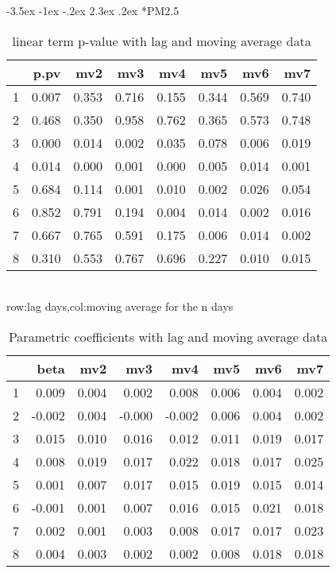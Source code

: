 \documentclass[a4paper, 12pt]{article}
\makeatletter
\def\large{\fontsize{14}{20}\selectfont}
\renewcommand\subsection{\@startsection {subsection}{1}{\z@}%
                                   {-3.5ex \@plus -1ex \@minus -.2ex}%
                                   {2.3ex \@plus.2ex}%
                                   {\centering\normalfont\large\bfseries}}
\makeatother
\begin{document}
\clearpage
\subsection*{PM2.5}
\begin{table}[h]
\centering
\caption{linear term p-value with lag and moving average data}
\begin{tabular}{rrrrrrrr}
  \hline
 & p.pv & mv2 & mv3 & mv4 & mv5 & mv6 & mv7 \\
  \hline
1 & 0.007 & 0.353 & 0.716 & 0.155 & 0.344 & 0.569 & 0.740 \\
  2 & 0.468 & 0.350 & 0.958 & 0.762 & 0.365 & 0.573 & 0.748 \\
  3 & 0.000 & 0.014 & 0.002 & 0.035 & 0.078 & 0.006 & 0.019 \\
  4 & 0.014 & 0.000 & 0.001 & 0.000 & 0.005 & 0.014 & 0.001 \\
  5 & 0.684 & 0.114 & 0.001 & 0.010 & 0.002 & 0.026 & 0.054 \\
  6 & 0.852 & 0.791 & 0.194 & 0.004 & 0.014 & 0.002 & 0.016 \\
  7 & 0.667 & 0.765 & 0.591 & 0.175 & 0.006 & 0.014 & 0.002 \\
  8 & 0.310 & 0.553 & 0.767 & 0.696 & 0.227 & 0.010 & 0.015 \\
   \hline
\end{tabular}
\\row:lag days,col:moving average for the n days
\end{table}

\begin{table}[h]
\centering
\caption{Parametric coefficients with lag and moving average data}
\begin{tabular}{rrrrrrrr}
  \hline
 & beta & mv2 & mv3 & mv4 & mv5 & mv6 & mv7 \\
  \hline
1 & 0.009 & 0.004 & 0.002 & 0.008 & 0.006 & 0.004 & 0.002 \\
  2 & -0.002 & 0.004 & -0.000 & -0.002 & 0.006 & 0.004 & 0.002 \\
  3 & 0.015 & 0.010 & 0.016 & 0.012 & 0.011 & 0.019 & 0.017 \\
  4 & 0.008 & 0.019 & 0.017 & 0.022 & 0.018 & 0.017 & 0.025 \\
  5 & 0.001 & 0.007 & 0.017 & 0.015 & 0.019 & 0.015 & 0.014 \\
  6 & -0.001 & 0.001 & 0.007 & 0.016 & 0.015 & 0.021 & 0.018 \\
  7 & 0.002 & 0.001 & 0.003 & 0.008 & 0.017 & 0.017 & 0.023 \\
  8 & 0.004 & 0.003 & 0.002 & 0.002 & 0.008 & 0.018 & 0.018 \\
   \hline
\end{tabular}
\end{table}
\clearpage
\end{document}
